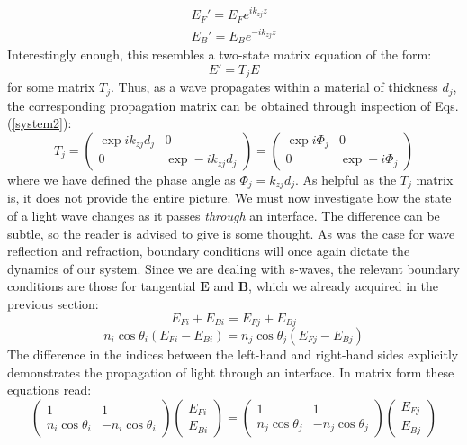 \documentclass[preprint, onecolumn, amsmath, amssymb, aps]{revtex4-1}
\numberwithin{equation}{section}
\begin{document}
\begin{align}\label{system2}
E_{F}' = E_{F} e^{ i k_{zj} z }  \nonumber \\
E_{B}' = E_{B} e^{ -i  k_{zj} z }
\end{align}
\noindent
Interestingly enough, this resembles a two-state matrix equation of the form:
\begin{equation}
E' = T_{j} E
\end{equation}
\noindent
for some matrix $T_{j}$. Thus, as a wave propagates within a material of thickness $d_{j}$, the corresponding propagation matrix can be obtained through inspection of Eqs.(\ref{system2}):
\begin{equation}\label{Tj}
T_{j} = 
\begin{pmatrix}
	\exp i k_{zj}d_{j} & 0 \\
	0 & \exp - i k_{zj}d_{j}
\end{pmatrix}  = 
\begin{pmatrix}
	\exp i \Phi_{j} & 0 \\
	0 & \exp - i \Phi_{j}
\end{pmatrix}
\end{equation}
\noindent
where we have defined the phase angle as $\Phi_{j} = k_{zj}d_{j}$. As helpful as the $T_{j}$ matrix is, it does not provide the entire picture. We must now investigate how the state of a light wave changes as it passes \textit{through} an interface. The difference can be subtle, so the reader is advised to give is some thought. As was the case for wave reflection and refraction, boundary conditions will once again dictate the dynamics of our system. Since we are dealing with s-waves, the relevant boundary conditions are those for tangential $\mathbf{E}$ and $\mathbf{B}$, which we already acquired in the previous section:
\begin{equation}
E_{Fi} + E_{Bi} = E_{Fj} + E_{Bj} \nonumber
\end{equation}
\begin{equation}
n_{i} \cos \theta_{i} (E_{Fi} - E_{Bi}) = n_{j} \cos \theta_{j} (E_{Fj} - E_{Bj})
\end{equation}
\noindent
The difference in the indices between the left-hand and right-hand sides explicitly demonstrates the propagation of light through an interface. In matrix form these equations read:
\begin{equation}
\begin{pmatrix}
		1 & 1 \\
	n_{i} \cos \theta_{i} & - n_{i} \cos \theta_{i}
\end{pmatrix} 
\begin{pmatrix}
	E_{Fi}  \\
    E_{Bi}
\end{pmatrix} =
\begin{pmatrix}
	1 & 1 \\
	n_{j} \cos \theta_{j} & - n_{j} \cos \theta_{j}
\end{pmatrix} 
\begin{pmatrix}
	E_{Fj}  \\
	E_{Bj}
\end{pmatrix}
\end{equation}
\end{document}
